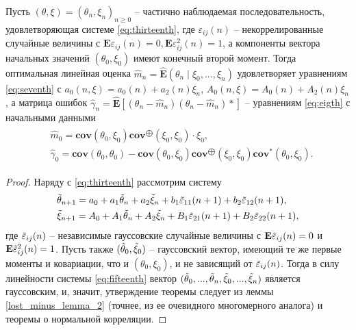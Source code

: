 \begin{theorem}\label{lost_minus_theor_2}
	Пусть $(\theta, \xi) = (\theta_n, \xi_n)_{n \geqslant 0}$ – частично наблюдаемая последовательность, удовлетворяющая системе \eqref{eq:thirteenth}, где $\varepsilon_{ij} (n)$ – некоррелированные случайные величины с $\mathbf{E}\varepsilon_{ij} (n) = 0, \mathbf{E} \varepsilon^2_{ij} (n) = 1$, а компоненты вектора начальных значений $(\theta_0, \xi_0)$ имеют конечный второй момент. Тогда оптимальная линейная оценка $\hat{m}_n = \widehat{\mathbf{E}} (\theta_n \mid \xi_0, ..., \xi_n)$ удовлетворяет уравнениям \eqref{eq:seventh} с $a_0 (n, \xi) = a_0 (n) + a_2 (n)\xi_n$, $A_0 (n, \xi) = A_0 (n) + A_2 (n)\xi_n$, а матрица ошибок $\hat{\gamma}_n = \widehat{\mathbf{E}} \left[(\theta_n - \hat{m}_n) (\theta_n - \hat{m}_n)*\right]$ – уравнениям \eqref{eq:eigth} с начальными данными
	\begin{align}
	\label{eq:fourteenth}
	\begin{split}
	& \hat{m}_0 = \mathbf{cov}(\theta_0, \xi_0) \mathbf{cov}^{\bigoplus} (\xi_0, \xi_0) \cdot \xi_0, \\
	& \hat{\gamma}_0 = \mathbf{cov}(\theta_0, \theta_0) - \mathbf{cov}(\theta_0, \xi_0) \mathbf{cov}^{\bigoplus} (\xi_0, \xi_0) \mathbf{cov}^* (\theta_0, \xi_0). 
	\end{split}
	\end{align}
\end{theorem}

\begin{proof}
	Наряду с \eqref{eq:thirteenth} рассмотрим систему
	\begin{align}
	\label{eq:fifteenth}
	\begin{split}
	& \Tilde{\theta}_{n + 1} = a_0 + a_1 \Tilde{\theta}_n + a_2 \Tilde{\xi}_n + b_1 \Tilde{\varepsilon}_{11}(n + 1) + b_2 \Tilde{\varepsilon}_{12}(n + 1), \\
	& \Tilde{\xi}_{n + 1} = A_0 + A_1 \Tilde{\theta}_n + A_2 \Tilde{\xi}_n + B_1 \Tilde{\varepsilon}_{21}(n + 1) + B_2 \Tilde{\varepsilon}_{22}(n + 1),
	\end{split}
	\end{align}
	где  $\Tilde{\varepsilon}_{ij}(n)$ – независимые гауссовские случайные величины с $\mathbf{E}\Tilde{\varepsilon}_{ij}(n) = 0$ и $\mathbf{E}\Tilde{\varepsilon}_{ij}^2(n)=1$. Пусть также $(\Tilde{\theta}_0, \Tilde{\xi}_0)$ – гауссовский вектор, имеющий те же первые моменты и ковариации, что и $(\theta_0, \xi_0)$, и не зависящий от $\Tilde{\varepsilon}_{ij} (n)$. Тогда в силу линейности системы \eqref{eq:fifteenth} вектор $(\Tilde{\theta}_0, ..., \Tilde{\theta}_n, \Tilde{\xi}_0, ..., \Tilde{\xi}_n)$ является гауссовским, и, значит, утверждение теоремы следует из леммы \ref{lost_minus_lemma_2} (точнее, из ее очевидного многомерного аналога) и теоремы о нормальной корреляции. 
\end{proof}

